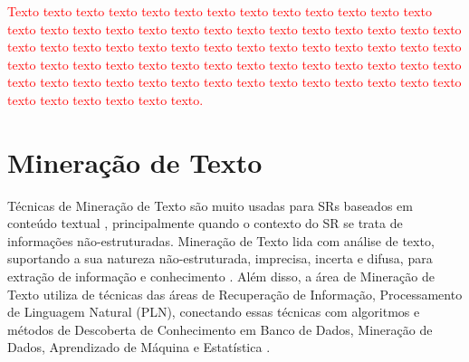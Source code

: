 \documentclass[normaltoc, espacoumemeio, pnumromarab,ruledheader]{abnt}
\begin{document}
	\textcolor{red}{Texto texto texto texto texto texto texto texto texto texto texto texto texto texto texto texto texto texto texto texto texto texto texto texto texto texto texto texto texto texto texto texto texto texto texto texto texto texto texto texto texto texto texto texto texto texto texto texto texto texto texto texto texto texto texto texto texto texto texto texto texto texto texto texto texto texto texto texto texto texto texto texto texto texto texto.}




		
\section{Mineração de Texto}

Técnicas de Mineração de Texto são muito usadas para SRs baseados em conteúdo textual \cite{Lops2011}, principalmente quando o contexto do SR se trata de informações não-estruturadas. Mineração de Texto lida com análise de texto, suportando a sua natureza não-estruturada, imprecisa, incerta e difusa, para extração de informação e conhecimento \cite{Hotho2005}. Além disso, a área de Mineração de Texto utiliza de técnicas das áreas de Recuperação de Informação, Processamento de Linguagem Natural (PLN), conectando essas técnicas com algoritmos e métodos de Descoberta de Conhecimento em Banco de Dados, Mineração de Dados, Aprendizado de Máquina e Estatística \cite{Hotho2005}.
\end{document}
